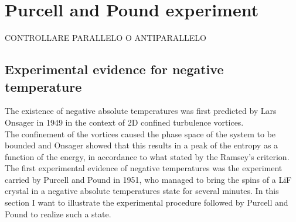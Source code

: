 \chapter{Purcell and Pound experiment}
\label{ch:PandP}

CONTROLLARE PARALLELO O ANTIPARALLELO
\section{Experimental evidence for negative temperature}
The existence of negative absolute temperatures was first predicted by Lars Onsager in 1949 \cite{Onsager} in the context of 2D confined turbulence vortices. \\
The confinement of the vortices caused the phase space of the system to be bounded and Onsager showed that this results in a peak of the entropy as a function of the energy, in accordance
to what stated by the Ramsey's criterion. \\
The first experimental evidence of negative temperatures was the experiment carried by Purcell and Pound \cite{PandP} in 1951, who managed to bring the spins of a LiF crystal in a negative absolute temperatures 
state for several minutes.
In this section I want to illustrate the experimental procedure followed by Purcell and Pound to realize such a state.\\
